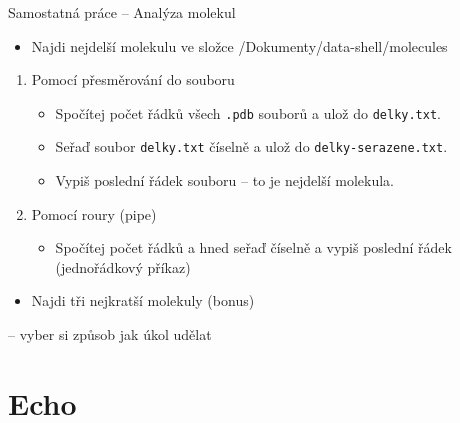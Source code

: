 \documentclass{beamer}
\newcommand{\ts}{\raisebox{-0.25em}{\textasciitilde}}
\begin{document}
\begin{frame}{Samostatná práce – Analýza molekul}
	\begin{itemize}	
		\item Najdi nejdelší molekulu ve složce \texttt{\ts}/Dokumenty/data-shell/molecules
	\end{itemize}
	\vspace{1.2em}
	\begin{enumerate}
	\item Pomocí přesměrování do souboru	
		\begin{itemize}	
		\item Spočítej počet řádků všech \texttt{.pdb} souborů a ulož do \texttt{delky.txt}.  
		\item	Seřaď soubor \texttt{delky.txt} číselně a ulož do \texttt{delky-serazene.txt}. 	 
		\item Vypiš poslední řádek souboru – to je nejdelší molekula.
		\end{itemize}	
	\vspace{0.5em}
	\item Pomocí roury (pipe)
		\begin{itemize}		 
		\item Spočítej počet řádků a hned seřaď číselně a vypiš poslední řádek (jednořádkový příkaz)
		\end{itemize}	
	\end{enumerate}	

	 \begin{itemize}
	 \item Najdi tři nejkratší molekuly (bonus)
	 \end{itemize}
	\hspace{1.8em} -- vyber si způsob jak úkol udělat

\end{frame}

\section{Echo}
\end{document}
